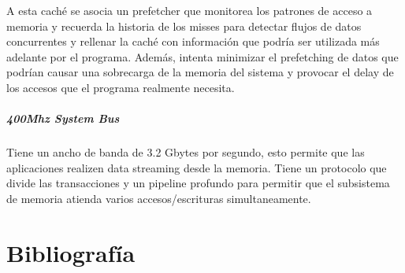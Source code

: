 A esta caché se asocia un prefetcher que monitorea los patrones de acceso a memoria y recuerda la historia de los misses para detectar flujos de datos concurrentes y rellenar la caché con información que podría ser utilizada más adelante por el programa. Además, intenta minimizar el prefetching de datos que podrían causar una sobrecarga de la memoria del sistema y provocar el delay de los accesos que el programa realmente necesita.

\subsubsection*{400Mhz System Bus}
Tiene un ancho de banda de 3.2 Gbytes por segundo, esto permite que las aplicaciones realizen data streaming desde la memoria. Tiene un protocolo que divide las transacciones y un pipeline profundo para permitir que el subsistema de memoria atienda varios accesos/escrituras simultaneamente. 
\newpage
\part*{Bibliografía}
\nocite{*}
\printbibliography[keyword=intro,title={Introduccion}]
\printbibliography[keyword=ilp,title={Instruction Level Paralellism}]
\printbibliography[keyword=memory,title={Jerarquías de memoria}]
\printbibliography[keyword=intel,title={Procesadores Intel}]


